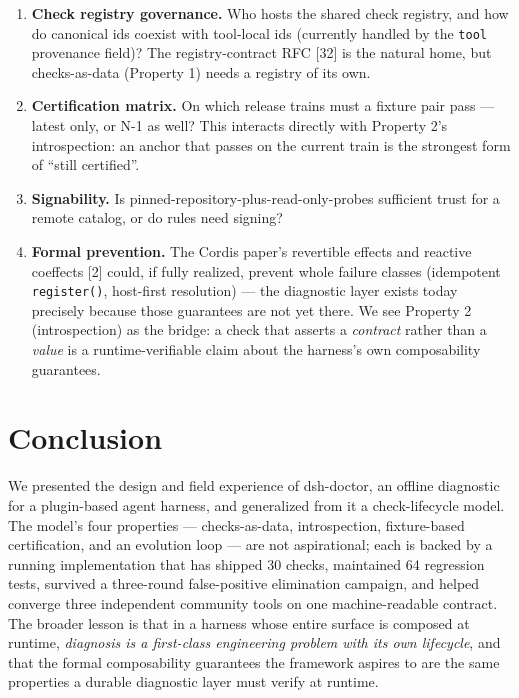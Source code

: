 \documentclass[11pt]{article}
\providecommand{\tightlist}{%
  \setlength{\itemsep}{0pt}\setlength{\parskip}{0pt}}
\begin{document}
\begin{enumerate}
\def\labelenumi{\arabic{enumi}.}
\tightlist
\item
  \textbf{Check registry governance.} Who hosts the shared check
  registry, and how do canonical ids coexist with tool-local ids
  (currently handled by the \texttt{tool} provenance field)? The
  registry-contract RFC [32] is the natural home, but checks-as-data
  (Property 1) needs a registry of its own.
\item
  \textbf{Certification matrix.} On which release trains must a fixture
  pair pass --- latest only, or N-1 as well? This interacts directly
  with Property 2's introspection: an anchor that passes on the current
  train is the strongest form of ``still certified''.
\item
  \textbf{Signability.} Is pinned-repository-plus-read-only-probes
  sufficient trust for a remote catalog, or do rules need signing?
\item
  \textbf{Formal prevention.} The Cordis paper's revertible effects and
  reactive coeffects [2] could, if fully realized, prevent whole
  failure classes (idempotent \texttt{register()}, host-first
  resolution) --- the diagnostic layer exists today precisely because
  those guarantees are not yet there. We see Property 2 (introspection)
  as the bridge: a check that asserts a \emph{contract} rather than a
  \emph{value} is a runtime-verifiable claim about the harness's own
  composability guarantees.
\end{enumerate}

\section{Conclusion}\label{conclusion}

We presented the design and field experience of dsh-doctor, an offline
diagnostic for a plugin-based agent harness, and generalized from it a
check-lifecycle model. The model's four properties --- checks-as-data,
introspection, fixture-based certification, and an evolution loop ---
are not aspirational; each is backed by a running implementation that
has shipped 30 checks, maintained 64 regression tests, survived a
three-round false-positive elimination campaign, and helped converge
three independent community tools on one machine-readable contract. The
broader lesson is that in a harness whose entire surface is composed at
runtime, \emph{diagnosis is a first-class engineering problem with its
own lifecycle}, and that the formal composability guarantees the
framework aspires to are the same properties a durable diagnostic layer
must verify at runtime.
\end{document}
